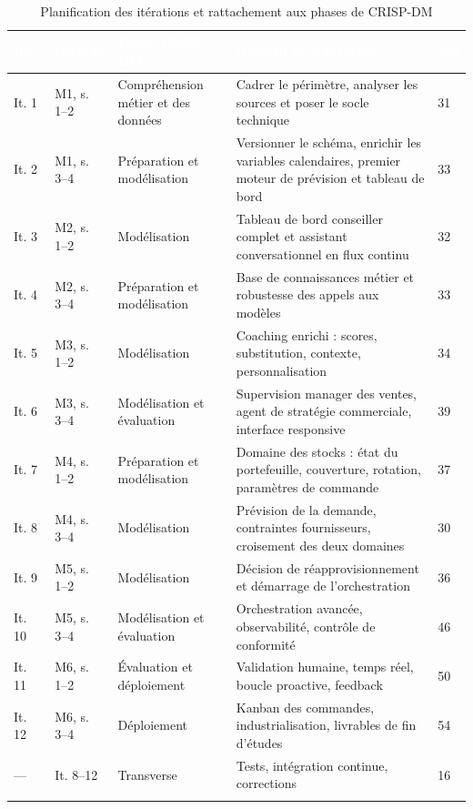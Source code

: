 \begin{longtable}{|P{1.1cm}|P{1.8cm}|P{2.9cm}|P{6.4cm}|P{1.1cm}|}
\hline
{}
\textcolor{white}{\textbf{Itér.}} &
\textcolor{white}{\textbf{Période}} &
\textcolor{white}{\textbf{Phase CRISP-DM}} &
\textcolor{white}{\textbf{Objectif de l'itération}} &
\textcolor{white}{\textbf{Pts}} \\
\hline
\endhead
\hline
\endfoot
\hline
\endlastfoot
It. 1 & M1, s. 1--2 & Compréhension métier et des données & Cadrer le périmètre, analyser les sources et poser le socle technique & 31 \\
\hline
It. 2 & M1, s. 3--4 & Préparation et modélisation & Versionner le schéma, enrichir les variables calendaires, premier moteur de prévision et tableau de bord & 33 \\
\hline
It. 3 & M2, s. 1--2 & Modélisation & Tableau de bord conseiller complet et assistant conversationnel en flux continu & 32 \\
\hline
It. 4 & M2, s. 3--4 & Préparation et modélisation & Base de connaissances métier et robustesse des appels aux modèles & 33 \\
\hline
It. 5 & M3, s. 1--2 & Modélisation & Coaching enrichi : scores, substitution, contexte, personnalisation & 34 \\
\hline
It. 6 & M3, s. 3--4 & Modélisation et évaluation & Supervision manager des ventes, agent de stratégie commerciale, interface responsive & 39 \\
\hline
It. 7 & M4, s. 1--2 & Préparation et modélisation & Domaine des stocks : état du portefeuille, couverture, rotation, paramètres de commande & 37 \\
\hline
It. 8 & M4, s. 3--4 & Modélisation & Prévision de la demande, contraintes fournisseurs, croisement des deux domaines & 30 \\
\hline
It. 9 & M5, s. 1--2 & Modélisation & Décision de réapprovisionnement et démarrage de l'orchestration & 36 \\
\hline
It. 10 & M5, s. 3--4 & Modélisation et évaluation & Orchestration avancée, observabilité, contrôle de conformité & 46 \\
\hline
It. 11 & M6, s. 1--2 & Évaluation et déploiement & Validation humaine, temps réel, boucle proactive, feedback & 50 \\
\hline
It. 12 & M6, s. 3--4 & Déploiement & Kanban des commandes, industrialisation, livrables de fin d'études & 54 \\
\hline
--- & It. 8--12 & Transverse & Tests, intégration continue, corrections & 16 \\
\hline
\caption{Planification des itérations et rattachement aux phases de CRISP-DM}
\label{tab:iterations-chap2}
\end{longtable}
\endgroup

